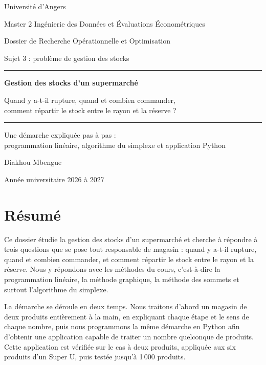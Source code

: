 \documentclass[11pt,a4paper]{article}
\begin{document}
\begin{titlepage}
\centering
{\large Université d'Angers\par}
{\large Master 2 Ingénierie des Données et Évaluations Économétriques\par}
\vspace{3.2cm}
{\large Dossier de Recherche Opérationnelle et Optimisation\par}
{\large Sujet 3 : problème de gestion des stocks\par}
\vspace{0.8cm}
\rule{\linewidth}{1pt}\par
\vspace{0.5cm}
{\huge\bfseries\color{bleu} Gestion des stocks d'un supermarché\par}
\vspace{0.4cm}
{\Large Quand y a-t-il rupture, quand et combien commander,\\[2pt]
comment répartir le stock entre le rayon et la réserve ?\par}
\vspace{0.5cm}
\rule{\linewidth}{1pt}\par
\vspace{1.2cm}
{\large Une démarche expliquée pas à pas :\\
programmation linéaire, algorithme du simplexe et application Python\par}
\vspace{3cm}
{\Large Diakhou Mbengue\par}
\vfill
{\large Année universitaire 2026 à 2027\par}
\end{titlepage}

\section*{Résumé}
Ce dossier étudie la gestion des stocks d'un supermarché et cherche à répondre à trois
questions que se pose tout responsable de magasin : quand y a-t-il rupture, quand et combien
commander, et comment répartir le stock entre le rayon et la réserve. Nous y répondons avec
les méthodes du cours, c'est-à-dire la programmation linéaire, la méthode graphique, la
méthode des sommets et surtout l'algorithme du simplexe.

La démarche se déroule en deux temps. Nous traitons d'abord un magasin de deux produits
entièrement à la main, en expliquant chaque étape et le sens de chaque nombre, puis nous
programmons la même démarche en Python afin d'obtenir une application capable de traiter un
nombre quelconque de produits. Cette application est vérifiée sur le cas à deux produits,
appliquée aux six produits d'un Super U, puis testée jusqu'à 1\,000 produits.
\end{document}
